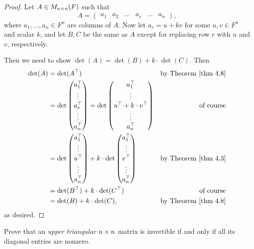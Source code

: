 \begin{proof}
Let \(A \in M_{n \times n}(F)\) such that
\[
    A = \begin{pmatrix} a_1 & a_2 & ... & a_r & ... & a_n
    \end{pmatrix},
\]
where \(a_1, ..., a_n \in F^n\) are columns of \(A\).
Now let \(a_r = u + kv\) for some \(u, v \in F^n\) and scalar \(k\), and let \(B, C\) be the same as \(A\) except for replacing row \(r\) with \(u\) and \(v\), respectively.

Then we need to show \(\det(A) = \det(B) + k \cdot \det(C)\).
Then
\begin{align*}
    \det(A) & = \det(A^\top) & \text{by \THM{4.8}} \\
            & = \det \begin{pmatrix} a_1^\top \\ \vdots \\ a_r^\top \\ \vdots \\ a_n^\top \end{pmatrix} = \det \begin{pmatrix} a_1^\top \\ \vdots \\ u^\top + k \cdot v^\top \\ \vdots \\ a_n^\top \end{pmatrix} & \text{of course} \\
            & = \det \begin{pmatrix} a_1^\top \\ \vdots \\ u^\top \\ \vdots \\ a_n^\top \end{pmatrix} + k \cdot \det \begin{pmatrix} a_1^\top \\ \vdots \\ v^\top \\ \vdots \\ a_n^\top \end{pmatrix} & \text{by \THM{4.3}} \\
            & = \det(B^\top) + k \cdot \det(C^\top) & \text{of course} \\
            & = \det(B) + k \cdot \det(C), & \text{by \THM{4.8}}
\end{align*}
as desired.
\end{proof}

\begin{exercise} \label{exercise 4.3.9}
Prove that an \emph{upper triangular} \(n \times n\) matrix is invertible if and only if all its diagonal entries are nonzero.
\end{exercise}

